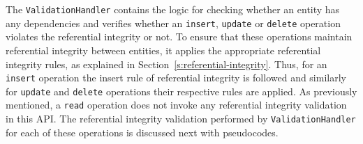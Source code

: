 		The \texttt{ValidationHandler} contains the  logic for checking whether an
		 entity has any dependencies and verifies whether an \texttt{insert},
		 \texttt{update} or \texttt{delete} operation  violates the referential
		integrity or not.  To ensure that these operations maintain referential
		 integrity between entities, it applies the appropriate referential integrity
		 rules, as explained in Section~\ref{s:referential-integrity}. Thus, for an
		 \texttt{insert} operation the insert rule of referential integrity is
		 followed and similarly for \texttt{update} and \texttt{delete} operations
		 their respective rules are applied. As previously mentioned, a \texttt{read}
		 operation does not invoke any referential integrity validation in this
		 \ac{API}. The referential integrity validation performed by
		 \texttt{ValidationHandler} for each of these operations is discussed next
		with pseudocodes.
		
